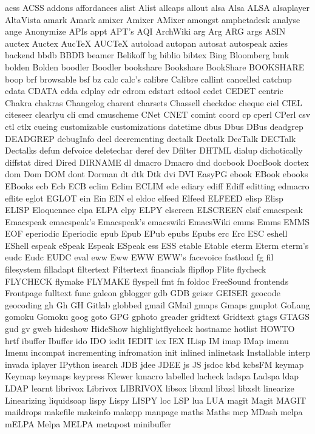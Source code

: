 acss
ACSS
addons
affordances
alist
Alist
allcaps
allout
alsa
Alsa
ALSA
alsaplayer
AltaVista
amark
Amark
amixer
Amixer
AMixer
amongst
amphetadesk
analyse
ange
Anonymize
APIs
appt
APT's
AQI
ArchWiki
arg
Arg
ARG
args
ASIN
auctex
Auctex
AucTeX
AUCTeX
autoload
autopan
autosat
autospeak
axies
backend
bbdb
BBDB
beamer
Belikoff
bg
biblio
bibtex
Bing
Bloomberg
bmk
bolden
Bolden
boodler
Boodler
bookshare
Bookshare
BookShare
BOOKSHARE
boop
brf
browsable
bsf
bz
calc
calc's
calibre
Calibre
callint
cancelled
catchup
cdata
CDATA
cdda
cdplay
cdr
cdrom
cdstart
cdtool
cedet
CEDET
centric
Chakra
chakras
Changelog
charent
charsets
Chassell
checkdoc
cheque
ciel
CIEL
citeseer
clearlyu
cli
cmd
cmuscheme
CNet
CNET
comint
coord
cp
cperl
CPerl
csv
ctl
ctlx
cueing
customizable
customizations
datetime
dbus
Dbus
DBus
deadgrep
DEADGREP
debugInfo
decl
decrementing
dectalk
Dectalk
DecTalk
DECTalk
Dectalks
defun
defvoice
deletechar
deref
dev
Dfilter
DHTML
dialup
dichotically
diffstat
dired
Dired
DIRNAME
dl
dmacro
Dmacro
dnd
docbook
DocBook
doctex
dom
Dom
DOM
dont
Dorman
dt
dtk
Dtk
dvi
DVI
EasyPG
ebook
EBook
ebooks
EBooks
ecb
Ecb
ECB
eclim
Eclim
ECLIM
ede
ediary
ediff
Ediff
editting
edmacro
eflite
eglot
EGLOT
ein
Ein
EIN
el
eldoc
elfeed
Elfeed
ELFEED
elisp
Elisp
ELISP
Eloquennce
elpa
ELPA
elpy
ELPY
elscreen
ELSCREEN
elsif
emacspeak
Emacspeak
emacspeak's
Emacspeak's
emacswiki
EmacsWiki
emms
Emms
EMMS
EOF
eperiodic
Eperiodic
epub
Epub
EPub
epubs
Epubs
erc
Erc
ESC
eshell
EShell
espeak
eSpeak
Espeak
ESpeak
ess
ESS
etable
Etable
eterm
Eterm
eterm's
eudc
Eudc
EUDC
eval
eww
Eww
EWW
EWW's
facevoice
fastload
fg
fil
filesystem
filladapt
filtertext
Filtertext
financials
flipflop
Flite
flycheck
FLYCHECK
flymake
FLYMAKE
flyspell
fmt
fn
foldoc
FreeSound
frontends
Frontpage
fulltext
func
galeon
gblogger
gdb
GDB
geiser
GEISER
geocode
geocoding
gh
Gh
GH
Gitlab
globbed
gmail
GMail
gmaps
Gmaps
gnuplot
GoLang
gomoku
Gomoku
goog
goto
GPG
gphoto
greader
gridtext
Gridtext
gtags
GTAGS
gud
gv
gweb
hideshow
HideShow
highlightflycheck
hostname
hotlist
HOWTO
hrtf
ibuffer
Ibuffer
ido
IDO
iedit
IEDIT
iex
IEX
ILisp
IM
imap
IMap
imenu
Imenu
incompat
incrementing
infromation
init
inlined
inlinetask
Installable
interp
invada
iplayer
IPython
isearch
JDB
jdee
JDEE
js
JS
jsdoc
kbd
kcbsFM
keymap
Keymap
keymaps
keypress
Klewer
kmacro
labelled
lacheck
ladspa
Ladspa
ldap
LDAP
learnt
librivox
Librivox
LIBRIVOX
libsox
libxml
libxsl
libxslt
linearize
Linearizing
liquidsoap
lispy
Lispy
LISPY
loc
LSP
lua
LUA
magit
Magit
MAGIT
maildrops
makefile
makeinfo
makepp
manpage
maths
Maths
mcp
MDash
melpa
mELPA
Melpa
MELPA
metapost
minibuffer
